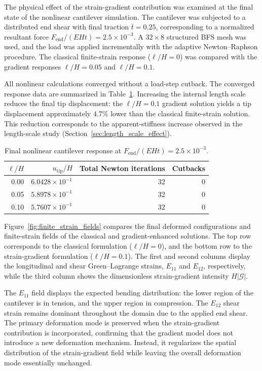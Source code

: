 \documentclass[preprint,12pt]{elsarticle}
\begin{document}
\label{sec:finite_strain_fields}

The physical effect of the strain-gradient contribution was examined at
the final state of the nonlinear cantilever simulation.  The cantilever
was subjected to a distributed end shear with final traction $\bar t=0.25$,
corresponding to a normalized resultant force
$F_{\mathrm{end}}/(EHt)=2.5\times10^{-3}$.  A $32\times8$ structured BFS
mesh was used, and the load was applied incrementally with the
adaptive Newton--Raphson procedure.  The classical finite-strain response
($\ell/H=0$) was compared with the gradient responses $\ell/H=0.05$ and
$\ell/H=0.1$.

All nonlinear calculations converged without a load-step cutback. The converged
response data are summarized in Table~\ref{tab:finite_field_response}.
Increasing the internal length scale reduces the final tip displacement: the
$\ell/H=0.1$ gradient solution yields a tip displacement approximately $4.7\%$ lower
than the classical finite-strain solution. This reduction corresponds to the
apparent-stiffness increase observed in the length-scale study (Section~\ref{sec:length_scale_effect}).

\begin{table}[htbp]
\centering
\caption{Final nonlinear cantilever response at
$F_{\mathrm{end}}/(EHt)=2.5\times10^{-3}$.}
\label{tab:finite_field_response}
\small
\begin{tabular}{rrrr}
\toprule
$\ell/H$ & $u_{\mathrm{tip}}/H$ & Total Newton iterations & Cutbacks \\
\midrule
0.00 & $6.0428\times10^{-1}$ & 32 & 0 \\
0.05 & $5.8978\times10^{-1}$ & 32 & 0 \\
0.10 & $5.7607\times10^{-1}$ & 32 & 0 \\
\bottomrule
\end{tabular}
\end{table}

Figure~\ref{fig:finite_strain_fields} compares the final deformed configurations
and finite-strain fields of the classical and gradient-enhanced solutions.
The top row corresponds to the classical formulation ($\ell/H=0$), and the bottom
row to the strain-gradient formulation ($\ell/H=0.1$). The first and second columns
display the longitudinal and shear Green--Lagrange strains, $E_{11}$ and $E_{12}$,
respectively, while the third column shows the dimensionless strain-gradient
intensity $H|\mathcal{G}|$.

The $E_{11}$ field displays the expected bending distribution: the lower region of
the cantilever is in tension, and the upper region in compression. The $E_{12}$
shear strain remains dominant throughout the domain due to the applied end shear.
The primary deformation mode is preserved when the strain-gradient contribution is
incorporated, confirming that the gradient model does not introduce a new deformation
mechanism. Instead, it regularizes the spatial distribution of the strain-gradient
field while leaving the overall deformation mode essentially unchanged.
\end{document}
